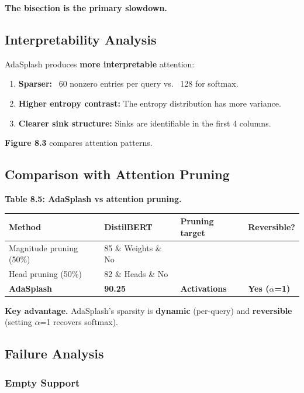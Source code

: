 \textbf{The bisection is the primary slowdown.}

\subsection{Interpretability Analysis}

AdaSplash produces \textbf{more interpretable} attention:

\begin{enumerate}
\item \textbf{Sparser:} ~60 nonzero entries per query vs. ~128 for softmax.
\item \textbf{Higher entropy contrast:} The entropy distribution has more variance.
\item \textbf{Clearer sink structure:} Sinks are identifiable in the first 4 columns.

\end{enumerate}
\textbf{Figure 8.3} compares attention patterns.

\subsection{Comparison with Attention Pruning}

\textbf{Table 8.5: AdaSplash vs attention pruning.}

\begin{table}[H]
\centering
\small
\begin{tabular}{llll}
\toprule
\textbf{Method} & \textbf{DistilBERT} & \textbf{Pruning target} & \textbf{Reversible?} \\
\midrule
Magnitude pruning (50\%) & 85 \& Weights \& No \\
Head pruning (50\%) & 82 \& Heads \& No \\
\textbf{AdaSplash} & \textbf{90.25} & \textbf{Activations} & \textbf{Yes ($\alpha$=1)} \\
\bottomrule
\end{tabular}
\end{table}

\textbf{Key advantage.} AdaSplash's sparsity is \textbf{dynamic} (per-query) and 
\textbf{reversible} (setting $\alpha$=1 recovers softmax).

\subsection{Failure Analysis}

\subsubsection{Empty Support}

